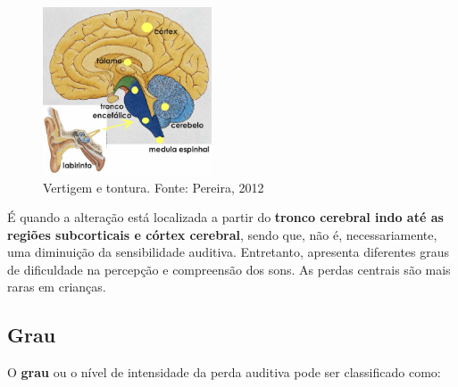 \documentclass[brasil]{abnt}
\begin{document}
\begin{itemize}
						\begin{figure}[h]
							\center
							\includegraphics[width=5cm]{pace.png}
							\caption{Vertigem e tontura. Fonte: Pereira, 2012}
						\end{figure}
						
						É quando a alteração está localizada a partir do \textbf{tronco cerebral indo até as regiões subcorticais e córtex cerebral}, sendo que, não é, necessariamente, uma diminuição da sensibilidade auditiva. Entretanto, apresenta
						diferentes graus de dificuldade na percepção e compreensão dos sons. As perdas centrais são mais raras em crianças.
					
				\end{itemize}
					
									
			\subsection{Grau}
				O \textbf{grau} ou o nível de intensidade da perda auditiva pode ser classificado como:
							
\end{document}
